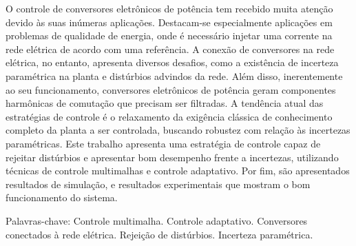 
	O controle de conversores eletrônicos de potência tem recebido muita atenção devido às suas inúmeras aplicações. Destacam-se especialmente aplicações em problemas de qualidade de energia, onde é necessário injetar uma corrente na rede elétrica de acordo com uma referência. A conexão de conversores na rede elétrica, no entanto, apresenta diversos desafios, como a existência de incerteza paramétrica na planta e distúrbios advindos da rede. Além disso, inerentemente ao seu funcionamento, conversores eletrônicos de potência geram componentes  harmônicas de comutação que precisam ser filtradas. A tendência atual das estratégias de controle é o relaxamento da exigência clássica de conhecimento completo da planta a ser controlada, buscando robustez com relação às incertezas paramétricas. Este trabalho apresenta uma estratégia de controle capaz de rejeitar distúrbios e apresentar bom desempenho frente a incertezas, utilizando técnicas de controle multimalhas e controle adaptativo. Por fim, são apresentados resultados de simulação, e resultados experimentais que mostram o bom funcionamento do sistema.

 \vspace{\onelineskip}

 \noindent
 Palavras-chave: Controle multimalha. Controle adaptativo. Conversores conectados à rede elétrica. Rejeição de distúrbios. Incerteza paramétrica.
